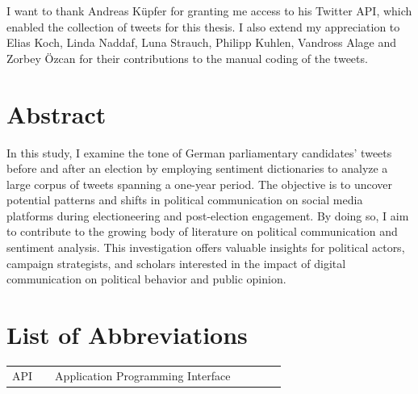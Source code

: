 \documentclass[a4paper,11pt]{article}
\begin{document}
I want to thank Andreas Küpfer for granting me access to his Twitter API,
which enabled the collection of tweets for this thesis. I also extend my
appreciation to Elias Koch, Linda Naddaf, Luna Strauch, Philipp Kuhlen, Vandross
Alage and Zorbey Özcan for their contributions to the manual coding of the tweets.
\pagestyle{plain}
\setcounter{page}{1}    %

\newpage
\hypertarget{abstract}{%
\section*{Abstract}\label{abstract}}

In this study, I examine the tone of German parliamentary candidates' tweets before and after an election by employing sentiment dictionaries to analyze a large corpus of tweets spanning a one-year period. The objective is to uncover potential patterns and shifts in political communication on social media platforms during electioneering and post-election engagement. By doing so, I aim to contribute to the growing body of literature on political communication and sentiment analysis. This investigation offers valuable insights for political actors, campaign strategists, and scholars interested in the impact of digital communication on political behavior and public opinion.

\newpage
\tableofcontents
\clearpage

\newpage
\hypertarget{list-of-abbreviations}{%
\section*{List of Abbreviations}\label{list-of-abbreviations}}
\begin{tabular}{rp{0.2cm}lp{1cm}rp{0.2cm}l}
    API     & &  Application Programming Interface
\end{tabular}
\newpage
\listoffigures
{}
\end{document}
